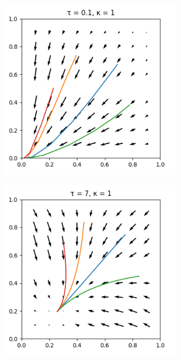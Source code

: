\documentclass[10pt,a4paper]{article}
\begin{document}
\begin{figure}[h]
    \centering
    \begin{subfigure}[b]{0.30\textwidth}
        \includegraphics[width=\textwidth]{Figures/boltzmann_pd_temp01.png}
    \end{subfigure}
    \begin{subfigure}[b]{0.30\textwidth}
        \includegraphics[width=\textwidth]{Figures/boltzmann_pd_temp7.png}

\end{subfigure}
\end{figure}
\end{document}
